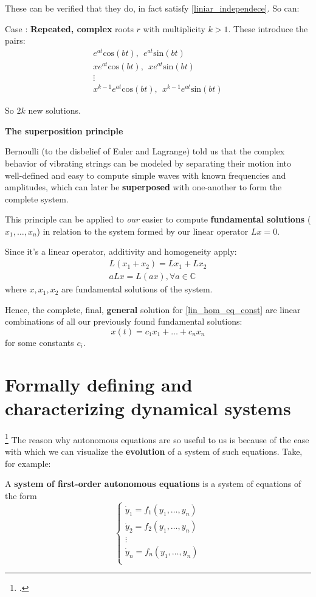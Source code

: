 These can be verified that they do, in fact satisfy \ref{liniar_independece}. So can:

Case : \textbf{Repeated, complex} roots $r$ with multiplicity $k>1$. These introduce the pairs:
\begin{align*}
	e^{at}\text{cos}(bt), \ \  e^{at}\text{sin}(bt)  \\
	xe^{at}\text{cos}(bt), \ \ xe^{at}\text{sin}(bt) \\
	\vdots                                           \\
	x^{k-1}e^{at}\text{cos}(bt), \ \ x^{k-1}e^{at}\text{sin}(bt)
\end{align*}

So $2k$ new solutions.

\textbf{The superposition principle}\cite{Hiroki2015}

Bernoulli (to the disbelief of Euler and Lagrange) told us that the complex behavior of vibrating strings can be modeled by separating their motion into well-defined and easy to compute simple waves with known frequencies and amplitudes, which can later be \textbf{superposed} with one-another to form the complete system.

This principle can be applied to \textit{our} easier to compute \textbf{fundamental solutions} ($x_1,\dots,x_n$) in relation to the system formed by our linear operator $Lx =0$.

Since it's a linear operator, additivity and homogeneity apply:
\begin{gather*}
	L(x_1+x_2) = Lx_1 + Lx_2\\
	aLx = L(ax) , \forall a \in \mathbb{C}
\end{gather*}
where $x,x_1,x_2$ are fundamental solutions of the system.

Hence, the complete, final, \textbf{general} solution for \ref{lin_hom_eq_const} are linear combinations of all our previously found fundamental solutions:
\[
	x(t) = c_1 x_1 + \dots + c_nx_n
\]
for some constants $c_i$.
\newpage
\section{Formally defining and characterizing dynamical systems}
\footcite{Hiroki2015}
The reason why autonomous equations are so useful to us is because of the ease with which we can visualize the \textbf{evolution} of a system of such equations.
Take, for example:
\begin{definition}
	A \textbf{system of first-order autonomous equations} is a system of equations of the form
	\begin{equation}\label{fo_system_auton_eq}
		\begin{cases}
			\dot{y}_1 = f_1(y_1,\dots, y_n) \\
			\dot{y}_2 = f_2(y_1,\dots, y_n) \\
			\vdots                          \\
			\dot{y}_n = f_n(y_1,\dots, y_n) \\
		\end{cases}
	\end{equation}
\end{definition}

